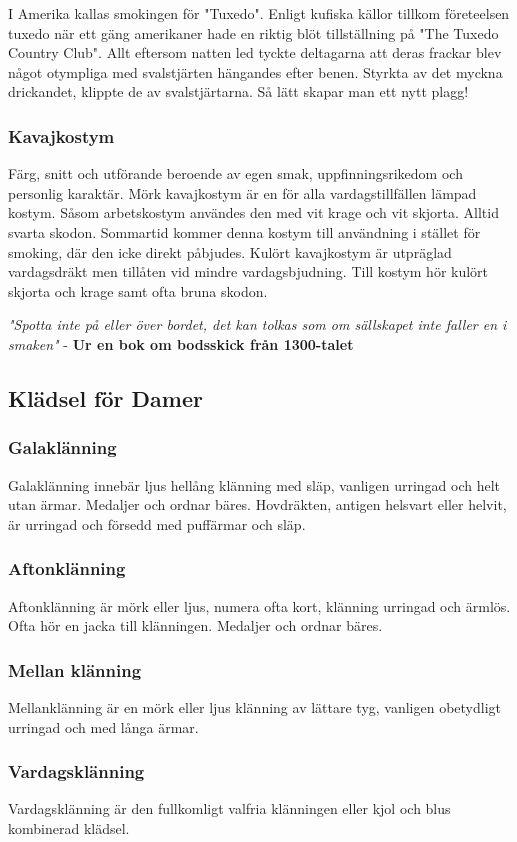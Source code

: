     I Amerika kallas smokingen för "Tuxedo". Enligt kufiska källor tillkom företeelsen tuxedo när ett gäng amerikaner hade en riktig blöt tillställning på "The Tuxedo Country Club". Allt eftersom natten led tyckte deltagarna att deras frackar blev något otympliga med svalstjärten hängandes efter benen. Styrkta av det myckna drickandet, klippte de av svalstjärtarna. Så lätt skapar man ett nytt plagg!

    \subsubsection*{\textbf{Kavajkostym}}

    Färg, snitt och utförande beroende av egen smak, uppfinningsrikedom och personlig karaktär. Mörk kavajkostym är en för alla vardagstillfällen lämpad kostym. Såsom arbetskostym användes den med vit krage och vit skjorta. Alltid svarta skodon. Sommartid kommer denna kostym till användning i stället för smoking, där den icke direkt påbjudes. Kulört kavajkostym är utpräglad vardagsdräkt men tillåten vid mindre vardagsbjudning. Till kostym hör kulört skjorta och krage samt ofta bruna skodon.

    \textit{"Spotta inte på eller över bordet, det kan tolkas som om sällskapet inte faller en i smaken"} - \textbf{Ur en bok om bodsskick från 1300-talet}

    \subsection*{\textbf{Klädsel för Damer}}
    \subsubsection*{\textbf{Galaklänning}}
    Galaklänning innebär ljus hellång klänning med släp, vanligen urringad och helt utan ärmar. Medaljer och ordnar bäres. Hovdräkten, antigen helsvart eller helvit, är urringad och försedd med puffärmar och släp.

    \subsubsection*{\textbf{Aftonklänning}}
    Aftonklänning är mörk eller ljus, numera ofta kort, klänning urringad och ärmlös. Ofta hör en jacka till klänningen. Medaljer och ordnar bäres.

    \subsubsection*{\textbf{Mellan klänning}}
    Mellanklänning är en mörk eller ljus klänning av lättare tyg, vanligen obetydligt urringad och med långa ärmar.

    \subsubsection*{\textbf{Vardagsklänning}}
    Vardagsklänning är den fullkomligt valfria klänningen eller kjol och blus kombinerad klädsel.
    

    
    

    \newpage